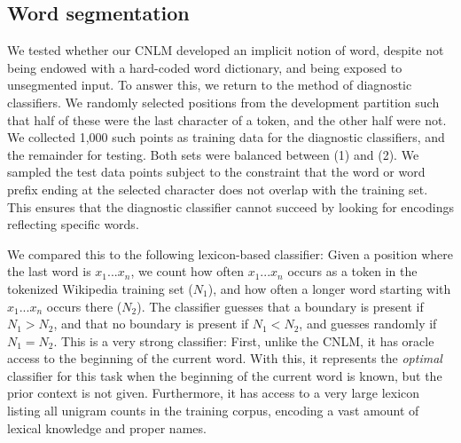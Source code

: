 \subsection{Word segmentation}
\label{sec:segmentation}


We tested whether our CNLM developed an implicit notion of word, despite not being endowed with a hard-coded word dictionary, and being exposed to unsegmented input. %
To answer this, we return to the method of diagnostic classifiers.
We randomly selected positions from the development partition such that half of these were the last character of a token, and the other half were not.
We collected 1,000 such points as training data for the diagnostic classifiers, and the remainder for testing.
Both sets were balanced between (1) and (2).
We sampled the test data points subject to the constraint that the word or word prefix ending at the selected character does not overlap with the training set.
This ensures that the diagnostic classifier cannot succeed by looking for encodings reflecting specific words.



We compared this to the following lexicon-based classifier:
Given a position where the last word is $x_1...x_n$, we count how often $x_1...x_n$ occurs as a token in the tokenized Wikipedia training set ($N_1$), and how often a longer word starting with $x_1...x_n$ occurs there ($N_2$).
The classifier guesses that a boundary is present if $N_1 > N_2$, and that no boundary is present if $N_1 < N_2$, and guesses randomly if $N_1 = N_2$.
This is a very strong classifier:
First, unlike the CNLM, it has oracle access to the beginning of the current word.
With this, it represents the \emph{optimal} classifier for this task when the beginning of the current word is known, but the prior context is not given.
Furthermore, it has access to a very large lexicon listing all unigram counts in the training corpus, encoding a vast amount of lexical knowledge and proper names.

